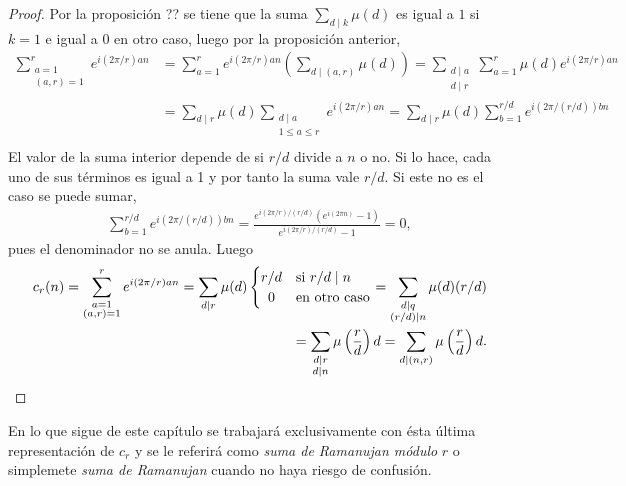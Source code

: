 \begin{proof}
Por la proposición ?? se tiene que la suma $\sum_{d \mid k} \mu(d)$ es igual a $1$ si $k=1$ e igual a 0 en otro caso, luego por la proposición anterior,
\begin{align*}
    \sum_{\substack{a=1 \\ (a,r)=1}}^{r} e^{i(2 \pi/r) a n} & = \sum_{a=1}^{r} e^{i(2 \pi / r) a n} \left( \sum_{d \mid (a,r)} \mu(d) \right) = \sum_{\substack{d \mid a \\ d \mid r}} \sum_{a=1}^{r}  \mu(d) e^{i(2 \pi / r) a n} \\
           & = \sum_{d \mid r} \mu(d) \sum_{\substack{d \mid a \\ 1 \le a \le r}} e^{i(2 \pi / r) a n} = \sum_{d \mid r} \mu(d) \sum_{b=1}^{r/d} e^{i (2 \pi / (r/d)) b n} \\
\end{align*}
El valor de la suma interior depende de si $r/d$ divide a $n$ o no. Si lo hace, cada uno de sus términos es igual a 1 y por tanto la suma vale $r/d$. Si este no es el caso se puede sumar,
\begin{align*}
    \sum_{b=1}^{r/d} e^{i (2 \pi / (r/d)) b n} = \frac{e^{i(2 \pi / r) / (r/d)} (e^{i(2 \pi n)} - 1)}{e^{i(2 \pi / r) / (r/d)} - 1} = 0,
\end{align*}
pues el denominador no se anula. Luego
\begin{align*}
    c_r (n) = \sum_{\substack{a=1 \\ (a,r)=1}}^{r} e^{i(2 \pi/r) a n} = \sum_{d \mid r} \mu(d) \begin{cases}
               \hfil r/d & \text{si } r/d \mid n \\
               \hfil 0 & \text{en otro caso}
           \end{cases} = \sum_{\substack{d \mid q \\ (r/d) \mid n}} \mu(d) (r/d) \\
           = \sum_{\substack{d \mid r \\ d \mid n}} \mu \left( \frac{r}{d} \right) d = \sum_{d \mid (n,r)} \mu \left( \frac{r}{d} \right) d.
\end{align*}
\end{proof}

En lo que sigue de este capítulo se trabajará exclusivamente con ésta última representación de $c_r$ y se le referirá como \emph{suma de Ramanujan módulo} $r$ o simplemete \emph{suma de Ramanujan} cuando no haya riesgo de confusión.

